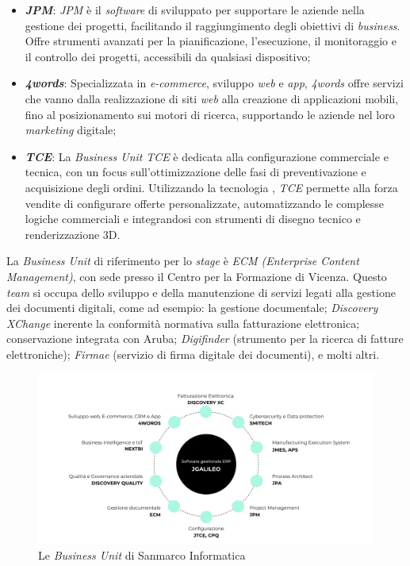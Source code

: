 \begin{itemize}
    \item \textbf{\emph{JPM}}: \emph{JPM} è il \emph{software} di  sviluppato per supportare le aziende nella gestione dei progetti, facilitando il raggiungimento degli obiettivi di \emph{business}. Offre strumenti avanzati per la pianificazione, l'esecuzione, il monitoraggio e il controllo dei progetti, accessibili da qualsiasi dispositivo;
    \item \textbf{\emph{4words}}: Specializzata in \emph{e-commerce}, sviluppo \emph{web} e \emph{app}, \emph{4words} offre servizi che vanno dalla realizzazione di siti \emph{web} alla creazione di applicazioni mobili, fino al posizionamento sui motori di ricerca, supportando le aziende nel loro \emph{marketing} digitale;
    \item \textbf{\emph{TCE}}: La \emph{Business Unit} \emph{TCE} è dedicata alla configurazione commerciale e tecnica, con un focus sull'ottimizzazione delle fasi di preventivazione e acquisizione degli ordini. Utilizzando la tecnologia , \emph{TCE} permette alla forza vendite di configurare offerte personalizzate, automatizzando le complesse logiche commerciali e integrandosi con strumenti di disegno tecnico e renderizzazione 3D.
\end{itemize}

La \emph{Business Unit} di riferimento per lo \emph{stage} è \emph{ECM (Enterprise Content Management)}, con sede presso il Centro per la Formazione di Vicenza. Questo \emph{team} si occupa dello sviluppo e della manutenzione di servizi legati alla gestione dei documenti digitali, come ad esempio: la gestione documentale; \emph{Discovery XChange} inerente la conformità normativa sulla fatturazione elettronica; conservazione  integrata con Aruba; \emph{Digifinder} (strumento per la ricerca di fatture elettroniche); \emph{Firmae} (servizio di firma digitale dei documenti), e molti altri.

\begin{figure}[h!]
    \centering
    \includegraphics[width=0.8\columnwidth]{img/business_unit.png}
    \caption{Le \emph{Business Unit} di Sanmarco Informatica}
    \label{fig:business_unit}
\end{figure}

